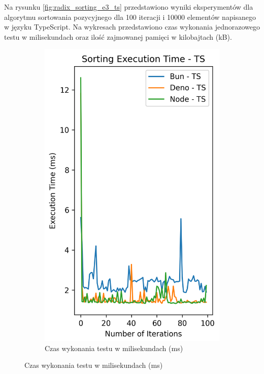 Na rysunku \ref{fig:radix_sorting_e3_ts} przedstawiono wyniki eksperymentów dla algorytmu sortowania pozycyjnego dla 100 iteracji i 10000 elementów napisanego w języku TypeScript. Na wykresach przedstawiono czas wykonania jednorazowego testu w milisekundach oraz ilość zajmowanej pamięci w kilobajtach (kB).

\begin{figure}[H]
  \centering
  \begin{subfigure}[b]{0.42\textwidth}
    \centering
    \includegraphics[width=\textwidth]{Figures/sorting/sorting_radix_100_10000_ts_time.png}
    \caption{Czas wykonania testu w milisekundach (ms)}

\end{subfigure}
\end{figure}
